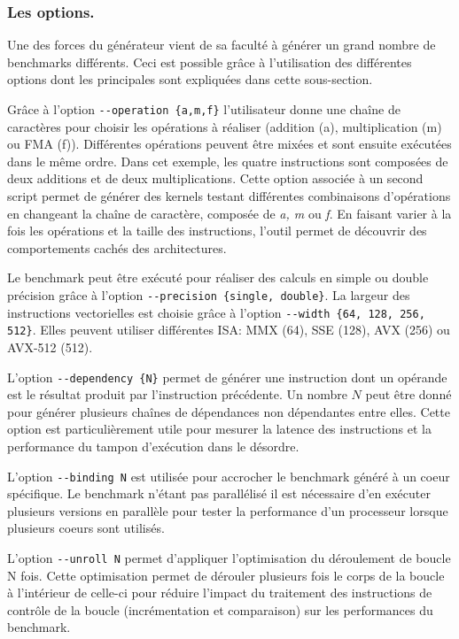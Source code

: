   
        \subsubsection{Les options.} 
        
            Une des forces du générateur vient de sa faculté à générer un grand nombre de benchmarks différents. Ceci est possible grâce à l'utilisation des différentes options dont les principales sont expliquées dans cette sous-section.
        
            Grâce à l'option \verb|--operation {a,m,f}| l'utilisateur donne une chaîne de caractères pour choisir  les opérations à réaliser (addition (a), multiplication (m) ou \gls{FMA} (f)). Différentes opérations peuvent être mixées et sont ensuite exécutées dans le même ordre. Dans cet exemple, les quatre instructions sont composées de deux additions et de deux multiplications. Cette option associée à un second script permet de générer des kernels testant différentes combinaisons d'opérations en changeant la chaîne de caractère, composée de \textit{a, m} ou \textit{f}. En faisant varier à la fois les opérations et la taille des instructions, l'outil permet de découvrir des comportements cachés des architectures.
    
            Le benchmark peut être exécuté pour réaliser des calculs en simple ou double précision grâce à l'option \verb|--precision {single, double}|. 
            La largeur des instructions vectorielles est choisie grâce à l'option \verb|--width {64, 128, 256, 512}|. Elles peuvent utiliser différentes ISA: MMX (64), SSE (128), AVX (256) ou AVX-512 (512). 
            
            L'option \verb|--dependency {N}| permet de générer une instruction  dont un opérande est le résultat produit par l'instruction précédente. Un nombre $N$ peut être donné pour générer plusieurs chaînes de dépendances non dépendantes entre elles. Cette option est particulièrement utile pour mesurer la latence des instructions et la performance du tampon d'exécution dans le désordre.
            
            L'option \verb|--binding N| est utilisée pour accrocher le benchmark généré à un coeur spécifique. Le benchmark n'étant pas parallélisé il est nécessaire d'en exécuter plusieurs versions en parallèle pour tester la performance d'un processeur lorsque plusieurs coeurs sont utilisés.
            
            L'option \verb|--unroll N| permet d'appliquer l'optimisation du déroulement de boucle N fois. Cette optimisation permet de dérouler plusieurs fois le corps de la boucle à l'intérieur de celle-ci pour réduire l'impact du traitement des instructions de contrôle de la boucle (incrémentation et comparaison) sur les performances du benchmark. 
            
